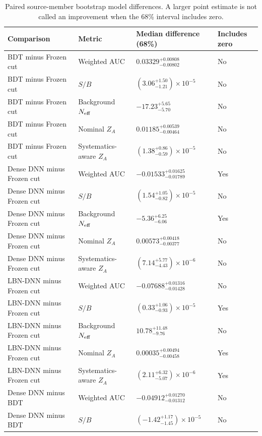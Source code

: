\begin{table}[tb]
  \centering
  \footnotesize
  \caption{Paired source-member bootstrap model differences. A larger point estimate is not called an improvement when the 68\% interval includes zero.}
  \label{tab:paired-model-differences}
  \begin{tabular}{llll}
    \toprule
    Comparison & Metric & Median difference (68\%) & Includes zero \\
    \midrule
    BDT minus Frozen cut & Weighted AUC & $0.03329^{+0.00808}_{-0.00802}$ & No \\
    BDT minus Frozen cut & $S/B$ & $(3.06^{+1.50}_{-1.21})\times10^{-5}$ & No \\
    BDT minus Frozen cut & Background $N_{\rm eff}$ & $-17.23^{+5.65}_{-5.70}$ & No \\
    BDT minus Frozen cut & Nominal $Z_A$ & $0.01185^{+0.00539}_{-0.00464}$ & No \\
    BDT minus Frozen cut & Systematics-aware $Z_A$ & $(1.38^{+0.86}_{-0.59})\times10^{-5}$ & No \\
    Dense DNN minus Frozen cut & Weighted AUC & $-0.01533^{+0.01625}_{-0.01789}$ & Yes \\
    Dense DNN minus Frozen cut & $S/B$ & $(1.54^{+1.05}_{-0.82})\times10^{-5}$ & No \\
    Dense DNN minus Frozen cut & Background $N_{\rm eff}$ & $-5.36^{+6.25}_{-6.06}$ & Yes \\
    Dense DNN minus Frozen cut & Nominal $Z_A$ & $0.00573^{+0.00418}_{-0.00377}$ & No \\
    Dense DNN minus Frozen cut & Systematics-aware $Z_A$ & $(7.14^{+5.77}_{-4.43})\times10^{-6}$ & No \\
    LBN-DNN minus Frozen cut & Weighted AUC & $-0.07688^{+0.01316}_{-0.01428}$ & No \\
    LBN-DNN minus Frozen cut & $S/B$ & $(0.33^{+1.06}_{-0.93})\times10^{-5}$ & Yes \\
    LBN-DNN minus Frozen cut & Background $N_{\rm eff}$ & $10.78^{+11.48}_{-9.76}$ & No \\
    LBN-DNN minus Frozen cut & Nominal $Z_A$ & $0.00035^{+0.00494}_{-0.00458}$ & Yes \\
    LBN-DNN minus Frozen cut & Systematics-aware $Z_A$ & $(2.11^{+6.32}_{-5.07})\times10^{-6}$ & Yes \\
    Dense DNN minus BDT & Weighted AUC & $-0.04912^{+0.01270}_{-0.01312}$ & No \\
    Dense DNN minus BDT & $S/B$ & $(-1.42^{+1.17}_{-1.45})\times10^{-5}$ & No \\

\end{tabular}
\end{table}
